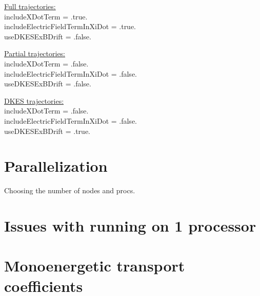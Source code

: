 {\setlength{\parindent}{0cm}

\underline{Full trajectories:}\\
{\ttfamily 
includeXDotTerm = .true.\\
includeElectricFieldTermInXiDot = .true.\\
useDKESExBDrift = .false.\\
}

\underline{Partial trajectories:}\\
{\ttfamily
includeXDotTerm = .false.\\
includeElectricFieldTermInXiDot = .false.\\
useDKESExBDrift = .false.\\
}

\underline{DKES trajectories:}\\
{\ttfamily
includeXDotTerm = .false.\\
includeElectricFieldTermInXiDot = .false.\\
useDKESExBDrift = .true.\\
}
}

\section{Parallelization}
Choosing the number of nodes and procs.

\section{Issues with running on 1 processor}

\section{Monoenergetic transport coefficients}
\label{sec:monoenergetic}

